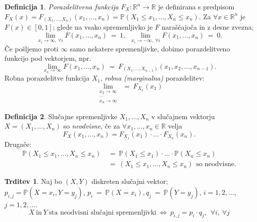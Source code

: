 \documentclass[11pt]{article}
\theoremstyle{definition}
\newtheorem{definicija}{Definicija}[section]
\theoremstyle{definition}
\newtheorem{trditev}{Trditev}[section]
\theoremstyle{definition}
\begin{document}
\begin{definicija}

\textit{Porazdelitvena funkcija} $F_X: \mathbb{R}^n \rightarrow \mathbb{R}$ je definirana s predpisom $F_X(x) = F_{(X_1, \ldots, X_n)}(x_1, \ldots, x_n) = \mathbb{P}(X_1 \leq x_1, \ldots, X_n \leq x_n)$. Za $\forall x \in \mathbb{R}^n$ je $F(x) \in [0, 1]$; glede na vsako spremenljivko je $F$ naraščajoča in z desne zvezna;
$$\lim_{x_i \rightarrow \infty, ~\forall i} F(x_1, \ldots, x_n) ~=~ 1, ~~\lim_{x_i \rightarrow -\infty, ~\forall i} F(x_1, \ldots, x_n) ~=~ 0.$$
Če pošljemo proti $\infty$ samo nekatere spremenljivke, dobimo porazdelitveno funkcijo pod vektorjem, npr.
$$\lim_{x_n \rightarrow \infty} F(x_1, \ldots, x_n) ~=~ F_{(X_1, \ldots, X_{n-1})}(x_1, x_2, \ldots, x_{n-1}).$$
Robna porazdelitve funkcija $X_1$, \textit{robna (marginalna)} porazdelitev:
$$\lim_{\substack{x_2 \rightarrow \infty \\ \cdots \\ x_n \rightarrow \infty}} ~=~ F_{X_1}(x_1)$$

\end{definicija}
\vspace{0.5cm}

\begin{definicija}

Slučajne spremenljivke $X_1, \ldots, X_n$ v slučajnem vektorju $X = (X_1, \ldots, X_n)$ so \textit{neodvisne}, če za $\forall x_1, \ldots, x_n \in \mathbb{R}$ velja 
$$F_X(x_1, \ldots, x_n) = F_{X_1}(x_1) \cdot \ldots \cdot F_{X_n}(x_n).$$
Drugače:
\begin{align*}
\mathbb{P}(X_1 \leq x_1, \ldots, X_n \leq x_n) ~&=~ \mathbb{P}(X_1 \leq x_1) \cdot \ldots \cdot \mathbb{P}(X_n \leq x_n) \\ 
~&=~ (X_1 \leq x_1, \ldots, X_n \leq x_n) ~~\text{so neodvisne}.
\end{align*}

\end{definicija}
\vspace{0.5cm}

\begin{trditev}

Naj bo $(X, Y)$ diskreten slučajni vektor; \\$p_{i,j} = \mathbb{P}(X = x_i, Y = y_j)$, $p_i ~=~ \mathbb{P}(X = x_i), q_j ~=~ \mathbb{P}(Y = y_j)$, $i = 1, 2, \ldots$, $j = 1, 2, \ldots$.
$$X ~\text{in}~ Y ~\text{sta neodvisni slučajni spremenljivki}~ \Leftrightarrow ~p_{i,j} = p_i \cdot q_j, ~~\forall i, ~\forall j $$

\end{trditev}
\vspace{0.5cm}
\end{document}
